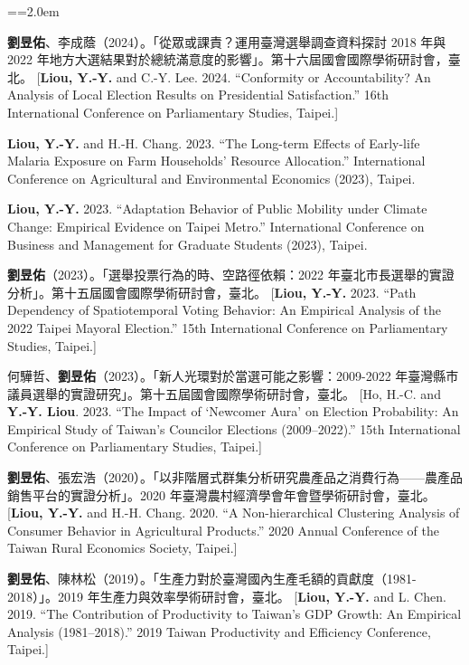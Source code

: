\documentclass[11pt,letterpaper]{article}
\newenvironment{hanglist}{\par\setlength{\parindent}{0pt}\everypar={\hangindent=2.0em\hangafter=1}}{\par}
\begin{document}
\begin{hanglist}

\textbf{劉昱佑}、李成蔭（2024）。「從眾或課責？運用臺灣選舉調查資料探討
2018 年與 2022
年地方大選結果對於總統滿意度的影響」。第十六屆國會國際學術研討會，臺北。
\newline{} {[}\textbf{Liou, Y.-Y.} and C.-Y. Lee. 2024. ``Conformity or
Accountability? An Analysis of Local Election Results on Presidential
Satisfaction.'' 16th International Conference on Parliamentary Studies,
Taipei.{]}

\textbf{Liou, Y.-Y.} and H.-H. Chang. 2023. ``The
Long-term Effects of Early-life Malaria Exposure on Farm Households'
Resource Allocation.'' International Conference on Agricultural and
Environmental Economics (2023), Taipei.

\textbf{Liou, Y.-Y.} 2023. ``Adaptation Behavior
of Public Mobility under Climate Change: Empirical Evidence on Taipei
Metro.'' International Conference on Business and Management for
Graduate Students (2023), Taipei.

\textbf{劉昱佑}（2023）。「選舉投票行為的時、空路徑依賴：2022
年臺北市長選舉的實證分析」。第十五屆國會國際學術研討會，臺北。
\newline{} {[}\textbf{Liou, Y.-Y.} 2023. ``Path Dependency of
Spatiotemporal Voting Behavior: An Empirical Analysis of the 2022 Taipei
Mayoral Election.'' 15th International Conference on Parliamentary
Studies, Taipei.{]}

何驊哲、\textbf{劉昱佑}（2023）。「新人光環對於當選可能之影響：2009-2022
年臺灣縣市議員選舉的實證研究」。第十五屆國會國際學術研討會，臺北。
\newline{} {[}Ho, H.-C. and \textbf{Y.-Y. Liou}. 2023. ``The Impact of
`Newcomer Aura' on Election Probability: An Empirical Study of Taiwan's
Councilor Elections (2009--2022).'' 15th International Conference on
Parliamentary Studies, Taipei.{]}

\textbf{劉昱佑}、張宏浩（2020）。「以非階層式群集分析研究農產品之消費行為------農產品銷售平台的實證分析」。2020
年臺灣農村經濟學會年會暨學術研討會，臺北。 \newline{} {[}\textbf{Liou,
Y.-Y.} and H.-H. Chang. 2020. ``A Non-hierarchical Clustering Analysis
of Consumer Behavior in Agricultural Products.'' 2020 Annual Conference
of the Taiwan Rural Economics Society, Taipei.{]}

\textbf{劉昱佑}、陳林松（2019）。「生產力對於臺灣國內生產毛額的貢獻度（1981-2018）」。2019
年生產力與效率學術研討會，臺北。 \newline{} {[}\textbf{Liou, Y.-Y.} and
L. Chen. 2019. ``The Contribution of Productivity to Taiwan's GDP
Growth: An Empirical Analysis (1981--2018).'' 2019 Taiwan Productivity
and Efficiency Conference, Taipei.{]}

\end{hanglist}
\end{document}

